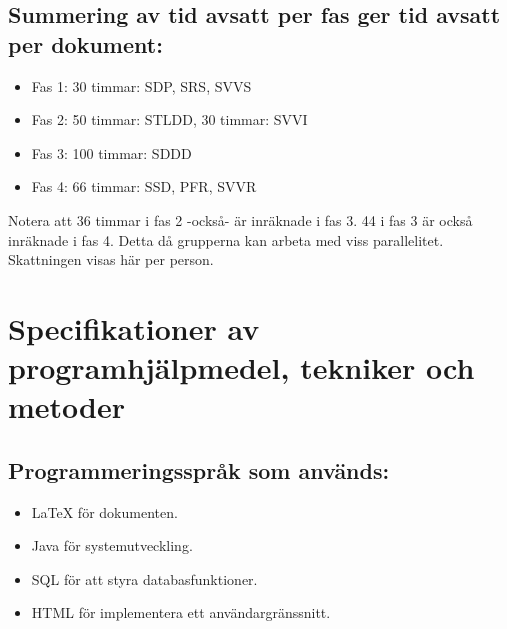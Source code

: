 \documentclass[paper=a4, fontsize=11pt,twoside]{article}
\begin{document}

\subsection*{Summering av tid avsatt per fas ger tid avsatt per dokument:}
\begin{itemize}
\item Fas 1: 30 timmar: SDP, SRS, SVVS
\item Fas 2: 50 timmar: STLDD, 30 timmar: SVVI
\item Fas 3: 100 timmar: SDDD
\item Fas 4: 66 timmar: SSD, PFR, SVVR
\end{itemize}
Notera att 36 timmar i fas 2 -också- är inräknade i fas 3. 44 i fas 3 är också inräknade i fas 4.
Detta då grupperna kan arbeta med viss parallelitet. Skattningen visas här per person.

\section{Specifikationer av programhjälpmedel, tekniker och metoder}

\subsection*{Programmeringsspråk som används:}
	\begin{itemize}
	\item LaTeX för dokumenten.
	\item Java för systemutveckling.
	\item SQL för att styra databasfunktioner.
	\item HTML för implementera ett användargränssnitt.
	\end{itemize}
\end{document}

